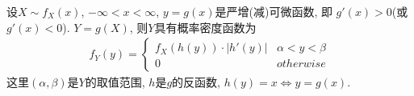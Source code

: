 \begin{definition}
    设$X\sim f_X(x)$, $-\infty < x < \infty$, $y=g(x)$是严增(减)可微函数, 即 $g'(x)>0$(或$g'(x)<0$). $Y=g(X)$,  则$Y$具有概率密度函数为
    \begin{align*}
        f_Y(y)=\left\{\begin{array}{lc}
            f_X\left(h(y)\right)\cdot \left| h'(y) \right| & \alpha<y<\beta\\ 0 & otherwise
        \end{array} \right.
    \end{align*}
    这里$(\alpha,\beta)$是$Y$的取值范围, $h$是$g$的反函数, $h(y)=x\Longleftrightarrow y=g(x)$.
\end{definition}